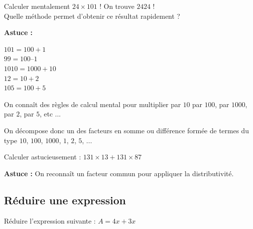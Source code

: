 \documentclass[a4paper,10pt]{report}
\begin{document}
\begin{meth}

\begin{center}
\og Calculer mentalement $24 \times 101$ ! On trouve $2424$ ! \\
Quelle méthode permet d'obtenir ce résultat rapidement ? \fg{}
\end{center}

\medskip
\noindent\grandscarreaux{\linewidth}{4.8cm}

\medskip
\noindent \textbf{Astuce :}

\medskip
\noindent \begin{minipage}{5cm}
$101 = 100 + 1$\\
$99 = 100 – 1$\\
$1010 = 1000 + 10$\\
$12 = 10 + 2$\\
$105 = 100 + 5$
\end{minipage}
\begin{minipage}{10cm}
On connaît des règles de calcul mental pour multiplier par $10$ par $100$, par $1000$, par $2$, par $5$, etc ...

\medskip
\noindent On décompose donc un des facteurs en somme ou différence formée de termes du type $10$, $100$, $1000$, $1$, $2$, $5$, ...
\end{minipage}
\end{meth}

\begin{meth}
Calculer astucieusement : $131 \times 13 + 131 \times 87$

\medskip
\noindent\grandscarreaux{\linewidth}{4cm}

\medskip
\noindent \textbf{Astuce : }On reconnaît un facteur commun pour appliquer la distributivité.
\end{meth}

\subsection{Réduire une expression}

\begin{meth}
Réduire l'expression suivante : $A = 4x + 3x$

\medskip
\noindent\grandscarreaux{\linewidth}{4cm}
\end{meth}
\end{document}
